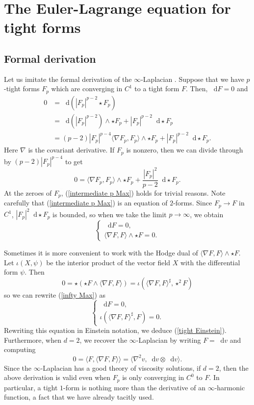 \documentclass[reqno,11pt]{amsart}
\newcommand*\dif{\mathop{}\!\mathrm{d}}
\theoremstyle{definition}
\numberwithin{equation}{section}
\begin{document}
\section{The Euler-Lagrange equation for tight forms}\label{infinityMax}
\subsection{Formal derivation}
Let us imitate the formal derivation of the $\infty$-Laplacian \cite{Aronsson67}.
Suppose that we have $p$-tight forms $F_p$ which are converging in $C^1$ to a tight form $F$.
Then, $\dif F = 0$ and
\begin{align*}
0
&= \dif(|F_p|^{p - 2} \star F_p) \\
&= \dif(|F_p|^{p - 2}) \wedge \star F_p + |F_p|^{p - 2} \dif \star F_p \\
&= (p - 2) |F_p|^{p - 4} \langle \nabla F_p, F_p\rangle \wedge \star F_p + |F_p|^{p - 2} \dif \star F_p.
\end{align*}
Here $\nabla$ is the covariant derivative.
If $F_p$ is nonzero, then we can divide through by $(p - 2) |F_p|^{p - 4}$ to get
\begin{equation}\label{intermediate p Max}
0 = \langle\nabla F_p, F_p\rangle \wedge \star F_p + \frac{|F_p|^2}{p - 2} \dif \star F_p.
\end{equation}
At the zeroes of $F_p$, (\ref{intermediate p Max}) holds for trivial reasons.
Note carefully that (\ref{intermediate p Max}) is an equation of $2$-forms.
Since $F_p \to F$ in $C^1$, $|F_p|^2 \dif \star F_p$ is bounded, so when we take the limit $p \to \infty$, we obtain 
\begin{equation}\label{infty Max}
\begin{cases}
\dif F = 0, \\
\langle \nabla F, F\rangle \wedge \star F = 0.
\end{cases}
\end{equation}

Sometimes it is more convenient to work with the Hodge dual of $\langle \nabla F, F\rangle \wedge \star F$.
Let $\iota(X, \psi)$ be the interior product of the vector field $X$ with the differential form $\psi$.
Then 
$$0 = \star(\star F \wedge \langle \nabla F, F\rangle) = \iota(\langle \nabla F, F\rangle^\sharp, \star^2 F)$$
so we can rewrite (\ref{infty Max}) as
\begin{equation}\label{dual infty Max}
\begin{cases}
\dif F = 0, \\
\iota(\langle \nabla F, F\rangle^\sharp, F) = 0.
\end{cases}
\end{equation}
Rewriting this equation in Einstein notation, we deduce (\ref{tight Einstein}).
Furthermore, when $d = 2$, we recover the $\infty$-Laplacian by writing $F = \dif v$ and computing 
$$0 = \langle F, \langle \nabla F, F\rangle\rangle = \langle \nabla^2 v, \dif v \otimes \dif v\rangle.$$
Since the $\infty$-Laplacian has a good theory of viscosity solutions, if $d = 2$, then the above derivation is valid even when $F_p$ is only converging in $C^0$ to $F$.
In particular, a tight $1$-form is nothing more than the derivative of an $\infty$-harmonic function, a fact that we have already tacitly used.
\end{document}

